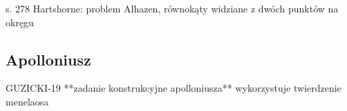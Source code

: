 s. 278 Hartshorne: problem Alhazen, równokąty widziane z dwóch punktów na okręgu

\subsection{Apolloniusz}
GUZICKI-19 **zadanie konstrukcyjne apolloniusza** wykorzystuje twierdzenie menelaosa










%

